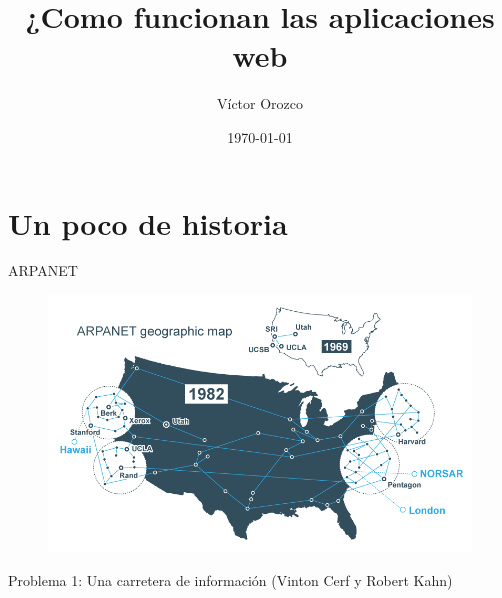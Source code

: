 \documentclass[aspectratio=169]{beamer}
\title{¿Como funcionan las aplicaciones web}
\author{Víctor Orozco}
\institute{Nabenik}
\date{\today}
\begin{document}
{
    \frame{\titlepage}
}


{
	\section{Un poco de historia}
}


\begin{frame}{ARPANET}
	\begin{figure}
		\centering
		\includegraphics[width=0.7\linewidth]{Images/darpa.png}
	\end{figure}
	
	Problema 1: Una carretera de información (Vinton Cerf y Robert Kahn)
\end{frame}
\end{document}
